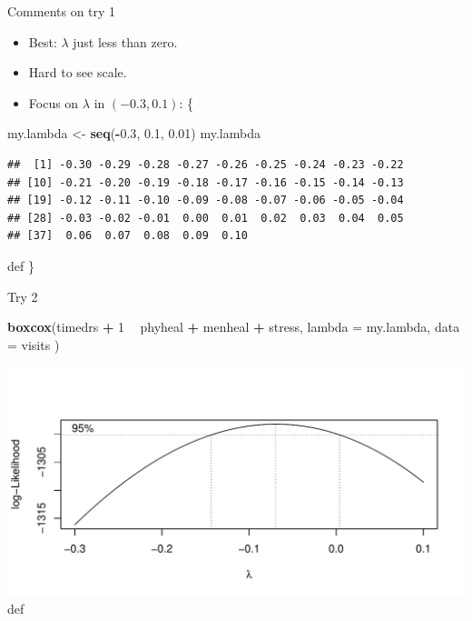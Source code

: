 \documentclass[ignorenonframetext,]{beamer}
\newenvironment{Shaded}{\begin{snugshade}}{\end{snugshade}}
\newcommand{\DataTypeTok}[1]{\textcolor[rgb]{0.13,0.29,0.53}{#1}}
\newcommand{\DecValTok}[1]{\textcolor[rgb]{0.00,0.00,0.81}{#1}}
\newcommand{\FloatTok}[1]{\textcolor[rgb]{0.00,0.00,0.81}{#1}}
\newcommand{\KeywordTok}[1]{\textcolor[rgb]{0.13,0.29,0.53}{\textbf{#1}}}
\newcommand{\NormalTok}[1]{#1}
\newcommand{\OperatorTok}[1]{\textcolor[rgb]{0.81,0.36,0.00}{\textbf{#1}}}
\newcommand{\StringTok}[1]{\textcolor[rgb]{0.31,0.60,0.02}{#1}}
\begin{document}
\begin{frame}[fragile]{Comments on try 1}
\protect\hypertarget{comments-on-try-1}{}

\begin{itemize}
\item
  Best: \(\lambda\) just less than zero.
\item
  Hard to see scale.
\item
  Focus on \(\lambda\) in \((-0.3,0.1)\): \{\small    
\end{itemize}

\begin{Shaded}
\begin{Highlighting}[]
\NormalTok{my.lambda <-}\StringTok{ }\KeywordTok{seq}\NormalTok{(}\OperatorTok{-}\FloatTok{0.3}\NormalTok{, }\FloatTok{0.1}\NormalTok{, }\FloatTok{0.01}\NormalTok{)}
\NormalTok{my.lambda}
\end{Highlighting}
\end{Shaded}

\begin{verbatim}
##  [1] -0.30 -0.29 -0.28 -0.27 -0.26 -0.25 -0.24 -0.23 -0.22
## [10] -0.21 -0.20 -0.19 -0.18 -0.17 -0.16 -0.15 -0.14 -0.13
## [19] -0.12 -0.11 -0.10 -0.09 -0.08 -0.07 -0.06 -0.05 -0.04
## [28] -0.03 -0.02 -0.01  0.00  0.01  0.02  0.03  0.04  0.05
## [37]  0.06  0.07  0.08  0.09  0.10
\end{verbatim}

def \}

\end{frame}

\begin{frame}[fragile]{Try 2}
\protect\hypertarget{try-2}{}

\begin{Shaded}
\begin{Highlighting}[]
\KeywordTok{boxcox}\NormalTok{(timedrs }\OperatorTok{+}\StringTok{ }\DecValTok{1} \OperatorTok{~}\StringTok{ }\NormalTok{phyheal }\OperatorTok{+}\StringTok{ }\NormalTok{menheal }\OperatorTok{+}\StringTok{ }\NormalTok{stress,}
  \DataTypeTok{lambda =}\NormalTok{ my.lambda,}
  \DataTypeTok{data =}\NormalTok{ visits}
\NormalTok{)}
\end{Highlighting}
\end{Shaded}

\includegraphics{figure/unnamed-chunk-42-1.pdf} def

\end{frame}
\end{document}
